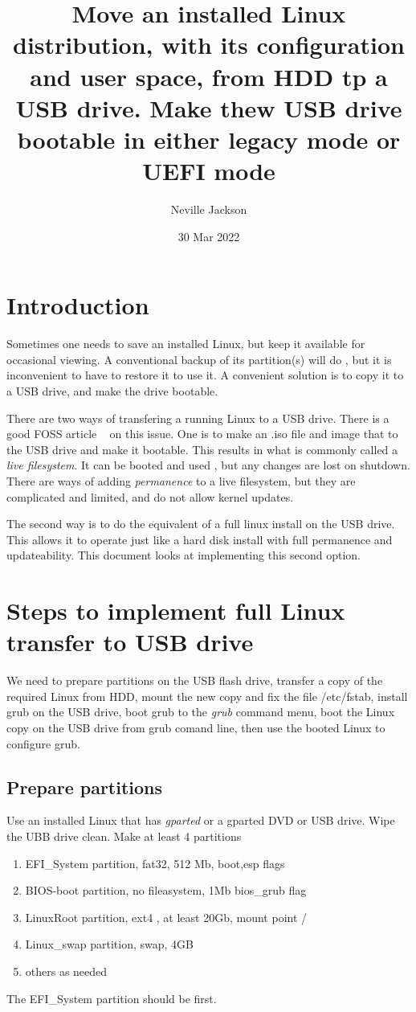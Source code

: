 \documentclass{article}  %
\title{Move an installed Linux distribution, with its configuration and user space, from HDD tp a USB drive. Make thew USB drive bootable in either legacy mode or UEFI mode}
\author{Neville Jackson}
\date{30 Mar 2022}
\begin{document}
 

\maketitle      

\section{Introduction} 
Sometimes one needs to save an installed Linux, but keep it available for occasional viewing. A conventional backup of its partition(s) will do , but it is inconvenient to have to restore it to use it. A convenient solution is to copy it to a USB drive, and make the drive bootable. 

There are two ways of transfering a running Linux to a USB drive. There is a good FOSS article ~\cite{foss:21} on this issue. One is to make an .iso file and image that to the USB drive and make it bootable. This results in what is commonly called a  {\em live filesystem}. It can be booted and used , but any changes are lost on shutdown. There are ways of adding {\em permanence} to a live filesystem, but they are complicated and limited, and do not allow kernel updates.

The second way  is to do  the equivalent of a full linux install on the USB drive. This allows it  to operate just like a hard disk install with full permanence and updateability. This document looks at implementing this second option.

\section{Steps to implement full Linux transfer to USB drive}
We need to prepare partitions on the USB flash drive, transfer a copy of the required Linux from HDD, mount the new copy and fix the file /etc/fstab, install grub on the USB drive, boot grub to the {\em grub} command menu, boot the Linux copy on the USB drive from grub comand line, then use the booted Linux to configure grub.

\subsection{Prepare partitions}
Use an installed Linux that has {\em gparted} or a gparted DVD or USB drive. Wipe the UBB drive clean. Make at least 4 partitions
\begin{enumerate}
\item EFI\_System  partition, fat32, 512 Mb, boot,esp flags
\item BIOS-boot partition, no fileasystem, 1Mb bios\_grub flag
\item LinuxRoot partition, ext4 , at least 20Gb, mount point /
\item Linux\_swap partition, swap, 4GB
\item others as needed
\end{enumerate}
The EFI\_System  partition should be first. 
\end{document}
